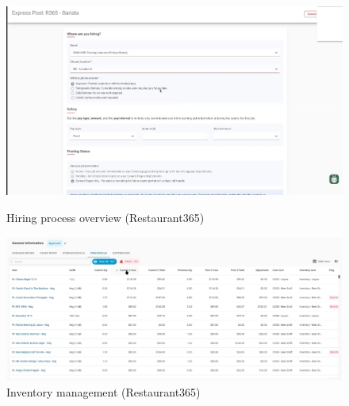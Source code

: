 \documentclass[]{VUMIFTemplateClass}
\begin{document}
\begin{figure}[h]
    \centering
    \begin{minipage}{0.48\textwidth}
        \centering
        \includegraphics[width=\textwidth]{images/examples/hiring_r365.png}
        \caption{Hiring process overview (Restaurant365)}
    \end{minipage}
    \hfill
    \begin{minipage}{0.48\textwidth}
        \centering
        \includegraphics[width=\textwidth]{images/examples/inventory_r365.png}
        \caption{Inventory management (Restaurant365)}
    \end{minipage}
\end{figure}
\end{document}
